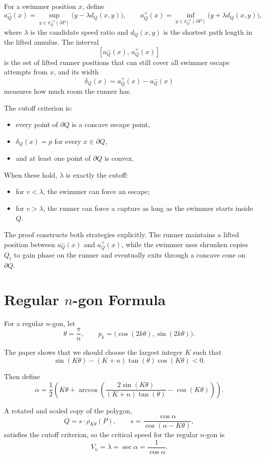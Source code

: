 \documentclass[11pt]{article}
\begin{document}
For a swimmer position $x$, define
\[
a_Q^-(x) = \sup_{y \in \pi_Q^{-1}(\partial P)} \bigl(y - \lambda d_Q(x,y)\bigr),
\qquad
a_Q^+(x) = \inf_{y \in \pi_Q^{-1}(\partial P)} \bigl(y + \lambda d_Q(x,y)\bigr),
\]
where $\lambda$ is the candidate speed ratio and $d_Q(x,y)$ is the shortest path length in the lifted annulus. The interval
\[
[a_Q^-(x),\, a_Q^+(x)]
\]
is the set of lifted runner positions that can still cover all swimmer escape attempts from $x$, and its width
\[
\delta_Q(x) = a_Q^+(x) - a_Q^-(x)
\]
measures how much room the runner has.

The cutoff criterion is:
\begin{itemize}
    \item every point of $\partial Q$ is a concave escape point,
    \item $\delta_Q(x) = p$ for every $x \in \partial Q$,
    \item and at least one point of $\partial Q$ is convex.
\end{itemize}

When these hold, $\lambda$ is exactly the cutoff:
\begin{itemize}
    \item for $v < \lambda$, the swimmer can force an escape;
    \item for $v > \lambda$, the runner can force a capture as long as the swimmer starts inside $Q$.
\end{itemize}

The proof constructs both strategies explicitly. The runner maintains a lifted position between $a_Q^-(x)$ and $a_Q^+(x)$, while the swimmer uses shrunken copies $Q_t$ to gain phase on the runner and eventually exits through a concave cone on $\partial Q$.

\section{Regular \texorpdfstring{$n$}{n}-gon Formula}
For a regular $n$-gon, let
\[
\theta = \frac{\pi}{n},
\qquad
p_k = \bigl(\cos(2k\theta), \sin(2k\theta)\bigr).
\]

The paper shows that we should choose the largest integer $K$ such that
\[
\sin(K\theta) - (K+n)\tan(\theta)\cos(K\theta) < 0.
\]

Then define
\[
\alpha
=
\frac{1}{2}
\left(
K\theta
+
\arccos\!\left(
\frac{2\sin(K\theta)}{(K+n)\tan(\theta)} - \cos(K\theta)
\right)
\right).
\]

A rotated and scaled copy of the polygon,
\[
Q = s \cdot \rho_{K\theta}(P),
\qquad
s = \frac{\cos \alpha}{\cos(\alpha - K\theta)},
\]
satisfies the cutoff criterion, so the critical speed for the regular $n$-gon is
\[
V_n = \lambda = \sec \alpha = \frac{1}{\cos \alpha}.
\]
\end{document}
